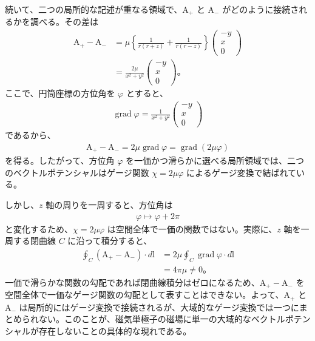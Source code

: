 \documentclass[platex,dvipdfmx,a4paper]{jsarticle}
\newcommand{\vect}[1]{\boldsymbol{\mathrm{#1}}}
\begin{document}
続いて、二つの局所的な記述が重なる領域で、\(\vect{A}_+\) と \(\vect{A}_-\) がどのように接続されるかを調べる。その差は
\begin{align*}
  \vect{A}_+-\vect{A}_-
  &=\mu\left\{\frac{1}{r(r+z)}+\frac{1}{r(r-z)}\right\}
  \begin{pmatrix}
    -y\\
    x\\
    0
  \end{pmatrix}\\
  &=\frac{2\mu}{x^2+y^2}
  \begin{pmatrix}
    -y\\
    x\\
    0
  \end{pmatrix}。
\end{align*}
ここで、円筒座標の方位角を \(\varphi\) とすると、
\begin{align*}
  \operatorname{grad}\varphi
  =\frac{1}{x^2+y^2}
  \begin{pmatrix}
    -y\\
    x\\
    0
  \end{pmatrix}
\end{align*}
であるから、
\begin{align*}
  \vect{A}_+-\vect{A}_-
  =2\mu\operatorname{grad}\varphi
  =\operatorname{grad}(2\mu\varphi)
\end{align*}
を得る。したがって、方位角 \(\varphi\) を一価かつ滑らかに選べる局所領域では、二つのベクトルポテンシャルはゲージ関数 \(\chi=2\mu\varphi\) によるゲージ変換で結ばれている。

しかし、\(z\) 軸の周りを一周すると、方位角は
\begin{align*}
  \varphi\longmapsto\varphi+2\pi
\end{align*}
と変化するため、\(\chi=2\mu\varphi\) は空間全体で一価の関数ではない。実際に、\(z\) 軸を一周する閉曲線 \(C\) に沿って積分すると、
\begin{align*}
  \oint_C(\vect{A}_+-\vect{A}_-)\cdot d\vect{l}
  &=2\mu\oint_C\operatorname{grad}\varphi\cdot d\vect{l}\\
  &=4\pi\mu\neq0。
\end{align*}
一価で滑らかな関数の勾配であれば閉曲線積分はゼロになるため、\(\vect{A}_+-\vect{A}_-\) を空間全体で一価なゲージ関数の勾配として表すことはできない。よって、\(\vect{A}_+\) と \(\vect{A}_-\) は局所的にはゲージ変換で接続されるが、大域的なゲージ変換では一つにまとめられない。このことが、磁気単極子の磁場に単一の大域的なベクトルポテンシャルが存在しないことの具体的な現れである。
\end{document}
